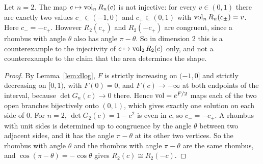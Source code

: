 \begin{theorem}\label{thm:main}
Let $n=2$. The map $c\mapsto\operatorname{vol}_nR_n(c)$ is not injective: for every $v\in(0,1)$ there are exactly two values $c_-\in(-1,0)$ and $c_+\in(0,1)$ with $\operatorname{vol}_nR_n(c_\pm)=v$.
Here $c_-=-c_+$. However $R_2(c_+)$ and $R_2(-c_+)$ are congruent, since a rhombus with angle $\theta$ also has angle $\pi-\theta$. So in dimension $2$ this is a counterexample to the injectivity of $c\mapsto\operatorname{vol}_2R_2(c)$ only, and not a counterexample to the claim that the area determines the shape.
\end{theorem}
\begin{proof}
By Lemma~\ref{lem:dlog}, $F$ is strictly increasing on $(-1,0]$ and strictly decreasing on $[0,1)$, with $F(0)=0$, and $F(c)\to-\infty$ at both endpoints of the interval, because $\det G_n(c)\to0$ there.
Hence $\operatorname{vol}=e^{F/2}$ maps each of the two open branches bijectively onto $(0,1)$, which gives exactly one solution on each side of $0$.
For $n=2$, $\det G_2(c)=1-c^2$ is even in $c$, so $c_-=-c_+$. A rhombus with unit sides is determined up to congruence by the angle $\theta$ between two adjacent sides, and it has the angle $\pi-\theta$ at its other two vertices. So the rhombus with angle $\theta$ and the rhombus with angle $\pi-\theta$ are the same rhombus, and $\cos(\pi-\theta)=-\cos\theta$ gives $R_2(c)\cong R_2(-c)$.
\end{proof}
